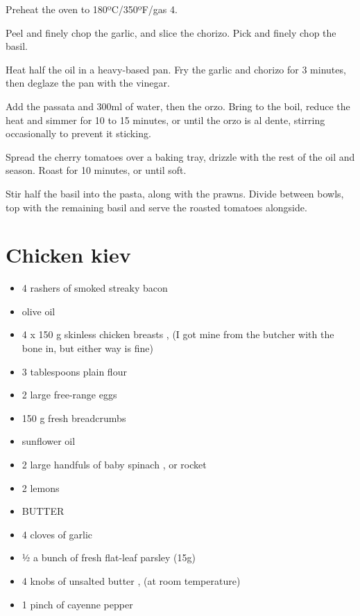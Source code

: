 \documentclass[
]{book}
\providecommand{\tightlist}{%
  \setlength{\itemsep}{0pt}\setlength{\parskip}{0pt}}
\begin{document}
Preheat the oven to 180ºC/350ºF/gas 4.

Peel and finely chop the garlic, and slice the chorizo. Pick and finely chop the basil.

Heat half the oil in a heavy-based pan. Fry the garlic and chorizo for 3 minutes, then deglaze the pan with the vinegar.

Add the passata and 300ml of water, then the orzo. Bring to the boil, reduce the heat and simmer for 10 to 15 minutes, or until the orzo is al dente, stirring occasionally to prevent it sticking.

Spread the cherry tomatoes over a baking tray, drizzle with the rest of the oil and season. Roast for 10 minutes, or until soft.

Stir half the basil into the pasta, along with the prawns. Divide between bowls, top with the remaining basil and serve the roasted tomatoes alongside.

\hypertarget{chicken-kiev}{%
\section{Chicken kiev}\label{chicken-kiev}}

\begin{itemize}
\tightlist
\item
  4 rashers of smoked streaky bacon
\item
  olive oil
\item
  4 x 150 g skinless chicken breasts , (I got mine from the butcher with the bone in, but either way is fine)
\item
  3 tablespoons plain flour
\item
  2 large free-range eggs
\item
  150 g fresh breadcrumbs
\item
  sunflower oil
\item
  2 large handfuls of baby spinach , or rocket
\item
  2 lemons
\item
  BUTTER
\item
  4 cloves of garlic
\item
  ½ a bunch of fresh flat-leaf parsley (15g)
\item
  4 knobs of unsalted butter , (at room temperature)
\item
  1 pinch of cayenne pepper
\end{itemize}
\end{document}
